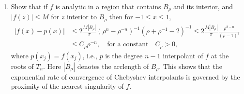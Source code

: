 \documentclass[10pt]{amsart}
\theoremstyle{nonumberplain}
\begin{document}
\begin{enumerate}[label={\bf {\arabic*}:}]
\begin{enumerate}
\item Show that if $f$ is analytic in a region that contains $B_\rho$ and its interior, and $|f(z)| \leq M$ for $z$ interior to $B_\rho$ then for $-1 \leq x \leq 1$,
\begin{align*}
|f(x) - p(x)|
	&\leq 2 \frac{M | B_\rho| }{\pi}  (\rho^n - \rho^{-n})^{-1} (\rho + \rho^{-1} - 2)^{-1} \leq 2 \frac{M | B_\rho| }{\pi} \frac{\rho^{2-n}}{(\rho - 1)^3} \\
	&\leq C_\rho \rho^{-n}, \quad \text{for a constant} \quad C_\rho > 0,
\end{align*}
where $p(x_j) = f(x_j)$, i.e., $p$ is the degree $n - 1$ interpolant of $f$ at the roots of $T_n$. 
Here $|B_\rho|$ denotes the arclength of $B_\rho$.  This shows that the exponential rate of convergence of Chebyshev interpolants is governed by the proximity of the nearest singularity of $f$. \\


\end{enumerate}
\end{enumerate}
\end{document}
